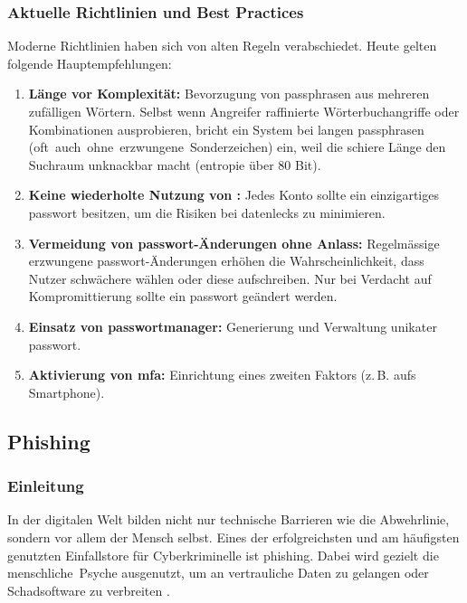 \documentclass[12pt,a4paper]{article}
\begin{document}
\newpage

\subsubsection{Aktuelle Richtlinien und Best Practices}
Moderne Richtlinien haben sich von alten Regeln verabschiedet. Heute gelten folgende Hauptempfehlungen:
\begin{enumerate}
    \item \textbf{Länge vor Komplexität:} Bevorzugung von \gls{passphrase}n aus mehreren \mbox{zufälligen} Wörtern. Selbst wenn Angreifer raffinierte Wörterbuchangriffe oder Kombinationen ausprobieren, bricht ein System bei langen \gls{passphrase}n \mbox{(oft auch ohne erzwungene Sonderzeichen)} ein, weil die schiere Länge den Suchraum unknackbar macht (\gls{entropie} über 80 Bit).
    \item \textbf{Keine wiederholte Nutzung von :} Jedes Konto sollte ein \mbox{einzigartiges} \gls{passwort} besitzen, um die Risiken bei \gls{datenleck}s zu minimieren.
    \item \textbf{Vermeidung von \gls{passwort}-Änderungen ohne Anlass:} Regelmässige \mbox{erzwungene} \gls{passwort}-Änderungen erhöhen die Wahrscheinlichkeit, dass Nutzer schwächere  wählen oder diese aufschreiben. Nur bei Verdacht auf Kompromittierung sollte ein \gls{passwort} geändert werden.  
    \item \textbf{Einsatz von \gls{passwortmanager}:} Generierung und Verwaltung unikater \mbox{\gls{passwort}}.
    \item \textbf{Aktivierung von \gls{mfa}:} Einrichtung eines zweiten Faktors (z.\,B. aufs \mbox{Smartphone}).
\end{enumerate}

\newpage
\subsection{Phishing}
\label{sec:phishing}

\subsubsection{Einleitung}
In der digitalen Welt bilden nicht nur technische Barrieren wie  die \mbox{Abwehrlinie}, sondern vor allem der Mensch selbst. Eines der erfolgreichsten und am \mbox{häufigsten} genutzten Einfallstore für Cyberkriminelle ist \gls{phishing}. Dabei wird gezielt die \mbox{menschliche Psyche} ausgenutzt, um an vertrauliche Daten zu gelangen oder \mbox{Schadsoftware} zu verbreiten \cite{bsi2023smtpsmuggling}.
\end{document}
